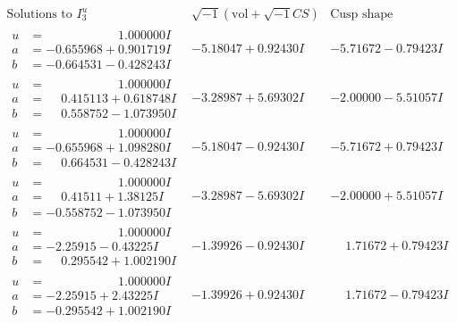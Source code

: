 \documentclass[1p]{elsarticle_modified}
\theoremstyle{definition}
\newcommand{\I}{\sqrt{-1}}
\begin{document}
$$\begin{array}{c|c|c}  
\text{Solutions to }I^u_{3}& \I (\text{vol} + \sqrt{-1}CS) & \text{Cusp shape}\\
 \hline 
\begin{aligned}
u &= \phantom{-0.000000 -}1.000000 I \\
a &= -0.655968 + 0.901719 I \\
b &= -0.664531 - 0.428243 I\end{aligned}
 & -5.18047 + 0.92430 I & -5.71672 - 0.79423 I \\ \hline\begin{aligned}
u &= \phantom{-0.000000 -}1.000000 I \\
a &= \phantom{-}0.415113 + 0.618748 I \\
b &= \phantom{-}0.558752 - 1.073950 I\end{aligned}
 & -3.28987 + 5.69302 I & -2.00000 - 5.51057 I \\ \hline\begin{aligned}
u &= \phantom{-0.000000 -}1.000000 I \\
a &= -0.655968 + 1.098280 I \\
b &= \phantom{-}0.664531 - 0.428243 I\end{aligned}
 & -5.18047 - 0.92430 I & -5.71672 + 0.79423 I \\ \hline\begin{aligned}
u &= \phantom{-0.000000 -}1.000000 I \\
a &= \phantom{-}0.41511 + 1.38125 I \\
b &= -0.558752 - 1.073950 I\end{aligned}
 & -3.28987 - 5.69302 I & -2.00000 + 5.51057 I \\ \hline\begin{aligned}
u &= \phantom{-0.000000 -}1.000000 I \\
a &= -2.25915 - 0.43225 I \\
b &= \phantom{-}0.295542 + 1.002190 I\end{aligned}
 & -1.39926 - 0.92430 I & \phantom{-}1.71672 + 0.79423 I \\ \hline\begin{aligned}
u &= \phantom{-0.000000 -}1.000000 I \\
a &= -2.25915 + 2.43225 I \\
b &= -0.295542 + 1.002190 I\end{aligned}
 & -1.39926 + 0.92430 I & \phantom{-}1.71672 - 0.79423 I \\ \hline\begin{aligned}

\end{aligned}
\end{array}$$
\end{document}
